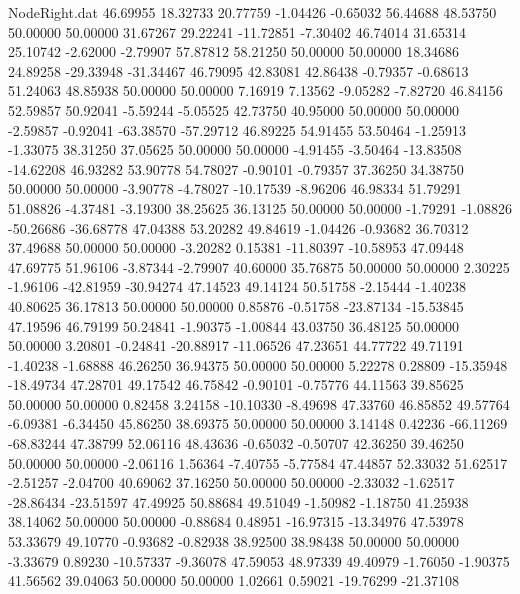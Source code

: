 \begin{filecontents}{NodeRight.dat}
  46.69955   18.32733   20.77759    -1.04426   -0.65032   56.44688   48.53750   50.00000   50.00000   31.67267   29.22241  -11.72851   -7.30402
  46.74014   31.65314   25.10742    -2.62000   -2.79907   57.87812   58.21250   50.00000   50.00000   18.34686   24.89258  -29.33948  -31.34467
  46.79095   42.83081   42.86438    -0.79357   -0.68613   51.24063   48.85938   50.00000   50.00000    7.16919    7.13562   -9.05282   -7.82720
  46.84156   52.59857   50.92041    -5.59244   -5.05525   42.73750   40.95000   50.00000   50.00000   -2.59857   -0.92041  -63.38570  -57.29712
  46.89225   54.91455   53.50464    -1.25913   -1.33075   38.31250   37.05625   50.00000   50.00000   -4.91455   -3.50464  -13.83508  -14.62208
  46.93282   53.90778   54.78027    -0.90101   -0.79357   37.36250   34.38750   50.00000   50.00000   -3.90778   -4.78027  -10.17539   -8.96206
  46.98334   51.79291   51.08826    -4.37481   -3.19300   38.25625   36.13125   50.00000   50.00000   -1.79291   -1.08826  -50.26686  -36.68778
  47.04388   53.20282   49.84619    -1.04426   -0.93682   36.70312   37.49688   50.00000   50.00000   -3.20282    0.15381  -11.80397  -10.58953
  47.09448   47.69775   51.96106    -3.87344   -2.79907   40.60000   35.76875   50.00000   50.00000    2.30225   -1.96106  -42.81959  -30.94274
  47.14523   49.14124   50.51758    -2.15444   -1.40238   40.80625   36.17813   50.00000   50.00000    0.85876   -0.51758  -23.87134  -15.53845
  47.19596   46.79199   50.24841    -1.90375   -1.00844   43.03750   36.48125   50.00000   50.00000    3.20801   -0.24841  -20.88917  -11.06526
  47.23651   44.77722   49.71191    -1.40238   -1.68888   46.26250   36.94375   50.00000   50.00000    5.22278    0.28809  -15.35948  -18.49734
  47.28701   49.17542   46.75842    -0.90101   -0.75776   44.11563   39.85625   50.00000   50.00000    0.82458    3.24158  -10.10330   -8.49698
  47.33760   46.85852   49.57764    -6.09381   -6.34450   45.86250   38.69375   50.00000   50.00000    3.14148    0.42236  -66.11269  -68.83244
  47.38799   52.06116   48.43636    -0.65032   -0.50707   42.36250   39.46250   50.00000   50.00000   -2.06116    1.56364   -7.40755   -5.77584
  47.44857   52.33032   51.62517    -2.51257   -2.04700   40.69062   37.16250   50.00000   50.00000   -2.33032   -1.62517  -28.86434  -23.51597
  47.49925   50.88684   49.51049    -1.50982   -1.18750   41.25938   38.14062   50.00000   50.00000   -0.88684    0.48951  -16.97315  -13.34976
  47.53978   53.33679   49.10770    -0.93682   -0.82938   38.92500   38.98438   50.00000   50.00000   -3.33679    0.89230  -10.57337   -9.36078
  47.59053   48.97339   49.40979    -1.76050   -1.90375   41.56562   39.04063   50.00000   50.00000    1.02661    0.59021  -19.76299  -21.37108

\end{filecontents}
